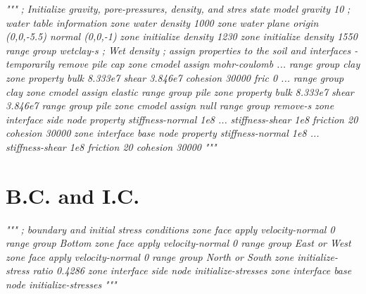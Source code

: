 \documentclass[a4paper, nobind]{templates/ociamthesis}
\newenvironment{Shaded}{\begin{snugshade}}{\end{snugshade}}
\newcommand{\CommentTok}[1]{\textcolor[rgb]{0.56,0.35,0.01}{\textit{#1}}}
\renewenvironment{Shaded}
{
  \vspace{10pt}%
  \begin{snugshade}%
}{%
  \end{snugshade}%
  \vspace{8pt}%
}
\begin{document}
\begin{Shaded}
\begin{Highlighting}[]
\CommentTok{"""}
\CommentTok{; Initialize gravity, pore{-}pressures, density, and stres state}
\CommentTok{model gravity 10}
\CommentTok{; water table information}
\CommentTok{zone water density 1000}
\CommentTok{zone water plane origin (0,0,{-}5.5) normal (0,0,{-}1)}
\CommentTok{zone initialize density 1230}
\CommentTok{zone initialize density 1550 range group \textquotesingle{}wetclay{-}s\textquotesingle{} ; Wet density}
\CommentTok{; assign properties to the soil and interfaces {-} temporarily remove pile cap}
\CommentTok{zone cmodel assign mohr{-}coulomb ...}
\CommentTok{     range group \textquotesingle{}clay\textquotesingle{}}
\CommentTok{zone property bulk 8.333e7  shear 3.846e7  cohesion 30000 fric 0 ...}
\CommentTok{     range group \textquotesingle{}clay\textquotesingle{}}
\CommentTok{zone cmodel assign elastic                 range group \textquotesingle{}pile\textquotesingle{}}
\CommentTok{zone property bulk 8.333e7  shear 3.846e7  range group \textquotesingle{}pile\textquotesingle{}}
\CommentTok{zone cmodel assign null                    range group \textquotesingle{}remove{-}s\textquotesingle{}}
\CommentTok{zone interface \textquotesingle{}side\textquotesingle{} node property stiffness{-}normal 1e8 ...}
\CommentTok{                           stiffness{-}shear 1e8 friction 20 cohesion 30000}
\CommentTok{zone interface \textquotesingle{}base\textquotesingle{} node property stiffness{-}normal 1e8 ...}
\CommentTok{                           stiffness{-}shear 1e8 friction 20 cohesion 30000}
\CommentTok{"""}
\end{Highlighting}
\end{Shaded}

\hypertarget{b.c.-and-i.c.}{%
\section{B.C. and I.C.}\label{b.c.-and-i.c.}}

\begin{Shaded}
\begin{Highlighting}[]
\CommentTok{"""}
\CommentTok{; boundary and initial stress conditions}
\CommentTok{zone face apply velocity{-}normal 0 range group \textquotesingle{}Bottom\textquotesingle{}}
\CommentTok{zone face apply velocity{-}normal 0 range group \textquotesingle{}East\textquotesingle{} or \textquotesingle{}West\textquotesingle{}}
\CommentTok{zone face apply velocity{-}normal 0 range group \textquotesingle{}North\textquotesingle{} or \textquotesingle{}South\textquotesingle{}}
\CommentTok{zone initialize{-}stress ratio 0.4286}
\CommentTok{zone interface \textquotesingle{}side\textquotesingle{} node initialize{-}stresses}
\CommentTok{zone interface \textquotesingle{}base\textquotesingle{} node initialize{-}stresses}
\CommentTok{"""}
\end{Highlighting}
\end{Shaded}
\end{document}
